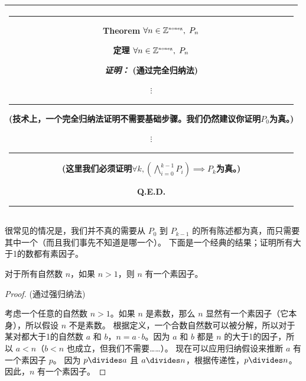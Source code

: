 \begin{center}
\begin{tabular}{|c|} \hline
\rule{16pt}{0pt}\begin{minipage}{.75\textwidth}

\rule{0pt}{16pt}{\bf \large Theorem} $ \displaystyle \forall n \in {\mathbb Z}^{\mbox{\tiny noneg}}, \; P_n $

{\bf \large 定理} $ \displaystyle \forall n \in {\mathbb Z}^{\mbox{\tiny noneg}}, \; P_n $
\medskip

\rule{0pt}{20pt} {\em 证明：} (通过完全归纳法)

\noindent {\bf 基础步骤：}

\begin{center}
$\vdots$ \rule{36pt}{0pt} \begin{minipage}[c]{1.7 in} (技术上，一个完全归纳法证明不需要基础步骤。我们仍然建议你证明$P_0$为真。) \end{minipage}
\end{center}

\noindent {\bf 归纳步骤：}

\begin{center}
$\vdots$ \rule{36pt}{0pt} \begin{minipage}[c]{1.7 in} (这里我们必须证明$\forall k,  \left( \bigwedge_{i=0}^{k-1} P_i \right) \implies P_{k}$为真。) \end{minipage}
\end{center}

\rule{0pt}{0pt} \hspace{\fill} Q.E.D.
\rule[-10pt]{0pt}{16pt}
\end{minipage} \rule{16pt}{0pt} \\ \hline
\end{tabular}
\end{center}
\medskip

很常见的情况是，我们并不真的需要从 $P_0$ 到 $P_{k-1}$ 的所有陈述都为真，而只需要其中一个（而且我们事先不知道是哪一个）。
下面是一个经典的结果；证明所有大于1的数都有素因子。

\begin{thm} 对于所有自然数 $n$，如果 $n > 1$，则 $n$ 有一个素因子。
\end{thm}

\begin{proof} (通过强归纳法)

考虑一个任意的自然数 $n>1$。如果 $n$ 是素数，那么 $n$ 显然有一个素因子（它本身），所以假设 $n$ 不是素数。
根据定义，一个合数自然数可以被分解，所以对于某对都大于1的自然数 $a$ 和 $b$，$n=a \cdot b$。因为 $a$ 和 $b$ 都是 $n$ 的大于1的因子，所以 $a < n$（$b < n$ 也成立，但我们不需要……）。
现在可以应用归纳假设来推断 $a$ 有一个素因子 $p$。
因为 $p \divides a$ 且 $a \divides n$，根据传递性，$p \divides n$。因此，$n$ 有一个素因子。
\end{proof}
  

\newpage





